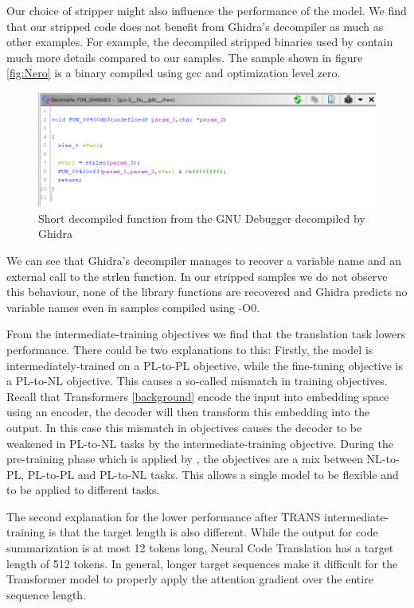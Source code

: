 Our choice of stripper might also influence the performance of the model. We find that our stripped code does not benefit from Ghidra's decompiler as much as other examples. For example, the decompiled stripped binaries used by \citeauthor{Nero} contain much more details compared to our samples. The sample shown in figure \ref{fig:Nero} is a binary compiled using gcc and optimization level zero.

\label{fig:Nero}
\begin{figure}[!h]
  \centering
  \includegraphics[width=\linewidth]{img/Nero.png}
  \caption{Short decompiled function from the GNU Debugger \cite{Nero} decompiled by Ghidra}
\end{figure}

We can see that Ghidra's decompiler manages to recover a variable name and an external call to the strlen function. In our stripped samples we do not observe this behaviour, none of the library functions are recovered and Ghidra predicts no variable names even in samples compiled using -O0.

From the intermediate-training objectives we find that the translation task lowers performance. There could be two explanations to this: Firstly, the model is intermediately-trained on a PL-to-PL objective, while the fine-tuning objective is a PL-to-NL objective. This causes a so-called mismatch in training objectives. Recall that Transformers \ref{background} encode the input into embedding space using an encoder, the decoder will then transform this embedding into the output. In this case this mismatch in objectives causes the decoder to be weakened in PL-to-NL tasks by the intermediate-training objective. During the pre-training phase which is applied by \citeauthor{CodeT5}, the objectives are a mix between NL-to-PL, PL-to-PL and PL-to-NL tasks. This allows a single model to be flexible and to be applied to different tasks.

The second explanation for the lower performance after TRANS intermediate-training is that the target length is also different. While the output for code summarization is at most 12 tokens long, Neural Code Translation has a target length of 512 tokens. In general, longer target sequences make it difficult for the Transformer model to properly apply the attention gradient over the entire sequence length.

